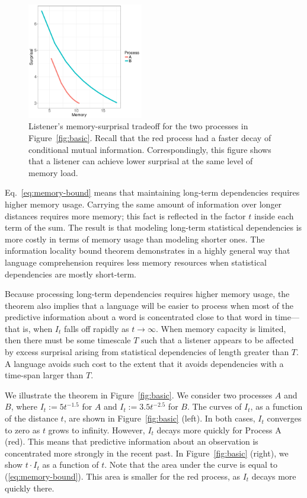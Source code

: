 \begin{figure}
\includegraphics[width=0.45\textwidth]{figures/listener-tradeoff.pdf}
	\caption{Listener's memory-surprisal tradeoff for the two processes in Figure~\ref{fig:basic}. Recall that the red process had a faster decay of conditional mutual information. Correspondingly, this figure shows that a listener can achieve lower surprisal at the same level of memory load. }\label{fig:listener-tradeoff}
\end{figure}

Eq.~\ref{eq:memory-bound} means that maintaining long-term dependencies requires higher memory usage. Carrying the same amount of information over longer distances requires more memory; this fact is reflected in the factor $t$ inside each term of the sum. 
The result is that modeling long-term statistical dependencies is more costly in terms of memory usage than modeling shorter ones.
The information locality bound theorem demonstrates in a highly general way that language comprehension requires less memory resources when statistical dependencies are mostly short-term. 

Because processing long-term dependencies requires higher memory usage, the theorem also implies that a language will be easier to process when most of the predictive information about a word is concentrated close to that word in time---that is, when $I_t$ falls off rapidly as $t \rightarrow \infty$. When memory capacity is limited, then there must be some timescale $T$ such that a listener appears to be affected by excess surprisal arising from statistical dependencies of length greater than $T$. A language avoids such cost to the extent that it avoids dependencies with a time-span larger than $T$.

We illustrate the theorem in Figure~\ref{fig:basic}.
We consider two processes $A$ and $B$, where $I_t := 5t^{-1.5}$ for $A$ and $I_t := 3.5 t^{-2.5}$ for $B$.
The curves of $I_t$, as a function of the distance $t$, are shown in Figure~\ref{fig:basic} (left).
In both cases, $I_t$ converges to zero as $t$ grows to infinity. 
However, $I_t$ decays more quickly for Process A (red).
This means that predictive information about an observation is concentrated more strongly in the recent past.
In Figure~\ref{fig:basic} (right), we show $t\cdot I_t$ as a function of $t$.
Note that the area under the curve is equal to (\ref{eq:memory-bound}).
This area is smaller for the red process, as $I_t$ decays more quickly there.  



